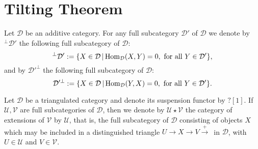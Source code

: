 \documentclass{proc-l}
\newcommand{\Hom}{{\rm Hom}}
\theoremstyle{definition}
\theoremstyle{remark}
\numberwithin{equation}{section}
\begin{document}
\section{Tilting Theorem}
Let $\mathcal{D}$ be an additive category. For any full subcategory $\mathcal{D}'$ of $\mathcal{D}$ we denote by 
$^\perp\mathcal{D}'$ the following full subcategory of $\mathcal{D}$: 
\[
^\perp\mathcal{D}':=\{X\in \mathcal{D} \,|\, \Hom_\mathcal{D}(X,Y)=0, \text{~for all~} Y\in\mathcal{D}'\},
\]
 and by $\mathcal{D}'^\perp$ the following full subcategory of $\mathcal{D}$: 
\[
\mathcal{D}'^\perp:=\{X\in \mathcal{D} \,|\, \Hom_\mathcal{D}(Y,X)=0, \text{~for all~} Y\in\mathcal{D}'\}.
\]

Let $\mathcal{D}$ be a triangulated category and denote its suspension functor by $?[1]$. If $\mathcal{U},\mathcal{V}$ are full subcategories of $\mathcal{D}$, then we denote by $\mathcal{U}\star \mathcal{V}$ the category of extensions of $\mathcal{V}$ by $\mathcal{U}$, that is, the full subcategory of $\mathcal{D}$ consisting of objects $X$ which may be included in a distinguished triangle $U\to X\to V \stackrel{+}\to\,$ in 
$\mathcal{D}$, with $U \in \mathcal{U}$ and $V \in \mathcal{V}$.
\end{document}

